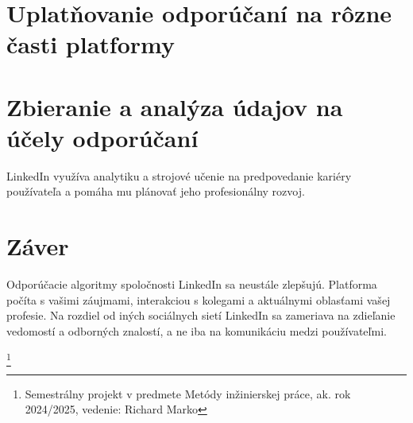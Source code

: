 \documentclass[twoside,slovak,a4paper]{coursepaper}
\begin{document}
\section{Uplatňovanie odporúčaní na rôzne časti platformy} \label{Uplatňovanie}


\section{Zbieranie a analýza údajov na účely odporúčaní} \label{analýza údajov}LinkedIn využíva analytiku a strojové učenie na predpovedanie kariéry používateľa a pomáha mu plánovať jeho profesionálny rozvoj.
 

\section{Záver} \label{zaver}
Odporúčacie algoritmy spoločnosti LinkedIn sa neustále zlepšujú. Platforma počíta s vašimi záujmami, interakciou s kolegami a aktuálnymi oblasťami vašej profesie. Na rozdiel od iných sociálnych sietí LinkedIn sa zameriava na zdieľanie vedomostí a odborných znalostí, a ne iba na komunikáciu medzi používateľmi.

\thanks{Semestrálny projekt v predmete Metódy inžinierskej práce, ak. rok 2024/2025, vedenie: Richard Marko}


 
\end{document}
